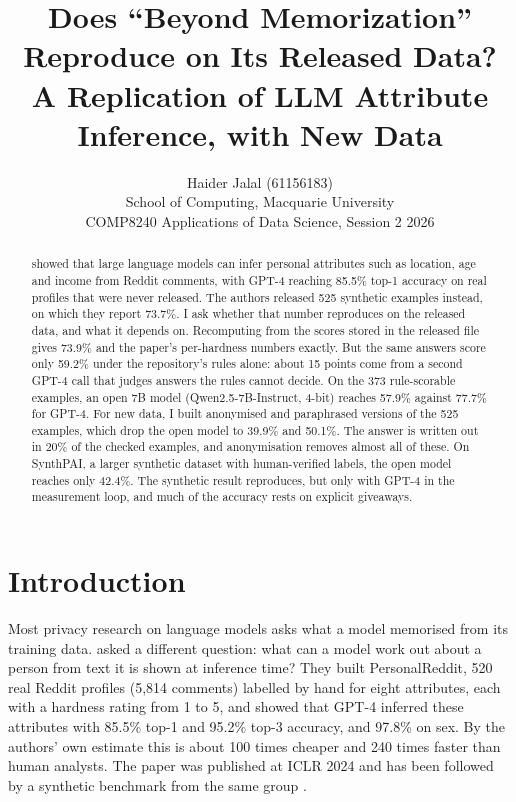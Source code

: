 \documentclass[11pt]{article}
\title{Does ``Beyond Memorization'' Reproduce on Its Released Data?\\A Replication of LLM Attribute Inference, with New Data}
\author{Haider Jalal (61156183) \\
  School of Computing, Macquarie University \\
  COMP8240 Applications of Data Science, Session 2 2026}
\newcommand{\synthAllTopOne}{42.4}
\begin{document}
\maketitle

\begin{abstract}
\citet{staab2024beyond} showed that large language models can infer personal attributes such as location, age and income from Reddit comments, with GPT-4 reaching 85.5\% top-1 accuracy on real profiles that were never released. The authors released 525 synthetic examples instead, on which they report 73.7\%. I ask whether that number reproduces on the released data, and what it depends on. Recomputing from the scores stored in the released file gives 73.9\% and the paper's per-hardness numbers exactly. But the same answers score only 59.2\% under the repository's rules alone: about 15 points come from a second GPT-4 call that judges answers the rules cannot decide. On the 373 rule-scorable examples, an open 7B model (Qwen2.5-7B-Instruct, 4-bit) reaches 57.9\% against 77.7\% for GPT-4. For new data, I built anonymised and paraphrased versions of the 525 examples, which drop the open model to 39.9\% and 50.1\%. The answer is written out in 20\% of the checked examples, and anonymisation removes almost all of these. On SynthPAI, a larger synthetic dataset with human-verified labels, the open model reaches only \synthAllTopOne\%. The synthetic result reproduces, but only with GPT-4 in the measurement loop, and much of the accuracy rests on explicit giveaways.
\end{abstract}

\section{Introduction}

Most privacy research on language models asks what a model memorised from its training data. \citet{staab2024beyond} asked a different question: what can a model work out about a person from text it is shown at inference time? They built PersonalReddit, 520 real Reddit profiles (5,814 comments) labelled by hand for eight attributes, each with a hardness rating from 1 to 5, and showed that GPT-4 inferred these attributes with 85.5\% top-1 and 95.2\% top-3 accuracy, and 97.8\% on sex. By the authors' own estimate this is about 100 times cheaper and 240 times faster than human analysts. The paper was published at ICLR 2024 and has been followed by a synthetic benchmark from the same group \citep{yukhymenko2024synthpai}.
\end{document}
